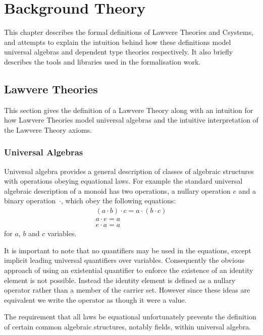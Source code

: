 \chapter{Background Theory}
This chapter describes the formal definitions of Lawvere Theories\cite{Lawvere}
and Csystems\cite{cartmellcsystems1}\cite{cartmellcsystems2}, and attempts to
explain the intuition behind how these definitions model universal algebras and
dependent type theories respectively. It also briefly describes the tools and
libraries used in the formalisation work.

\section{Lawvere Theories}
This section gives the definition of a Lawvere Theory along with an intuition
for how Lawvere Theories model universal algebras and the intuitive
interpretation of the Lawvere Theory axioms. 

\subsection{Universal Algebras}
Universal
algebra\cite{universalalgebra}\cite{univalg2}\cite{univalg3}\cite{univalg4}
provides a general description of classes of algebraic structures with
operations obeying equational laws. For example the standard universal algebraic
description of a monoid has two operations, a nullary operation $e$ and a binary
operation~$\cdot$, which obey the following equations:
\begin{gather*}
    (a\cdot b)\cdot c = a\cdot (b\cdot c) \\
    a \cdot e = a \\
    e \cdot a = a
\end{gather*}
for $a$, $b$ and $c$ variables.

It is important to note that no quantifiers may be used in the equations, except
implicit leading universal quantifiers over variables. Consequently the obvious
approach of using an existential quantifier to enforce the existence of an
identity element is not possible. Instead the identity element is defined as a
nullary operator rather than a member of the carrier set. However since these
ideas are equivalent we write the operator as though it were a value.

The requirement that all laws be equational unfortunately prevents the
definition of certain common algebraic structures, notably fields, within
universal algebra.

